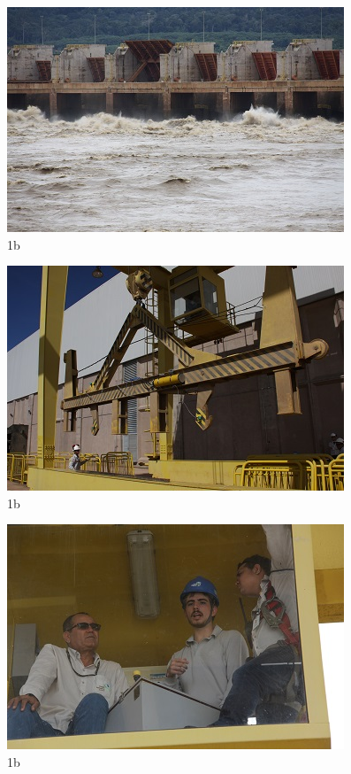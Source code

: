 \begin{figure}[h!]
  \centering
  \includegraphics[width=1\linewidth]{Fotos/Janeiro2015/12.jpg}
  \caption{1b}
  \label{nov20136}
\end{figure}

\begin{figure}[h!]
  \centering
  \includegraphics[width=1\linewidth]{Fotos/Janeiro2015/13.jpg}
  \caption{1b}
  \label{nov20136}
\end{figure}

\begin{figure}[h!]
  \centering
  \includegraphics[width=1\linewidth]{Fotos/Janeiro2015/14.jpg}
  \caption{1b}
  \label{nov20136}
\end{figure}

